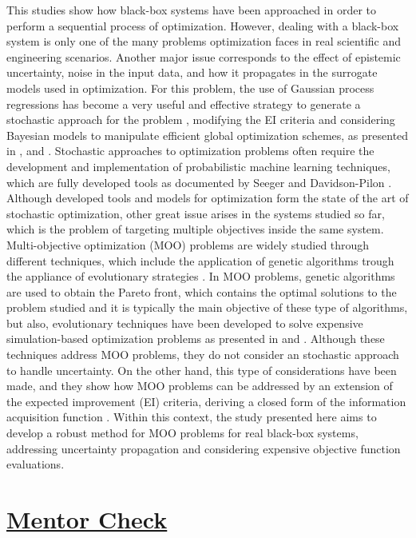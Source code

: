 \documentclass{journal}
\begin{document}
This studies show how black-box systems have been approached in order to perform a sequential process of optimization. However, dealing with a black-box system is only one of the many problems optimization faces in real scientific and engineering scenarios. Another major issue corresponds to the effect of epistemic uncertainty, noise in the input data, and how it propagates in the surrogate models used in optimization. For this problem, the use of Gaussian process regressions has become a very useful and effective strategy to generate a stochastic approach for the problem \cite{Wang2016}, modifying the EI criteria and considering Bayesian models to manipulate efficient global optimization schemes, as presented in \cite{Huang2006}, \cite{Pandita2016} and \cite{Li2014}. Stochastic approaches to optimization problems often require the development and implementation of probabilistic machine learning techniques, which are fully developed tools as documented by Seeger \cite{Seeger2004} and Davidson-Pilon \cite{Davidson-Pilon2014}. Although developed tools and models for optimization form the state of the art of stochastic optimization, other great issue arises in the systems studied so far, which is the problem of targeting multiple objectives inside the same system.\\

Multi-objective optimization (MOO) problems are widely studied through different techniques, which include the application of genetic algorithms trough the appliance of evolutionary strategies \cite{Costa2006}. In MOO problems, genetic algorithms are used to obtain the Pareto front, which contains the optimal solutions to the problem studied and it is typically the main objective of these type of algorithms, but also, evolutionary techniques have been developed to solve expensive simulation-based optimization problems as presented in \cite{Guo2007} and \cite{Huang2009}. Although these techniques address MOO problems, they do not consider an stochastic approach to handle uncertainty. On the other hand, this type of considerations have been made, and they show how MOO problems can be addressed by an extension of the expected improvement (EI) criteria, deriving a closed form of the information acquisition function \cite{wagner2010expected}. Within this context, the study presented here aims to develop a robust method for MOO problems for real black-box systems, addressing uncertainty propagation and considering expensive objective function evaluations.\\


\section{\underline{Mentor Check}}



\end{document}
